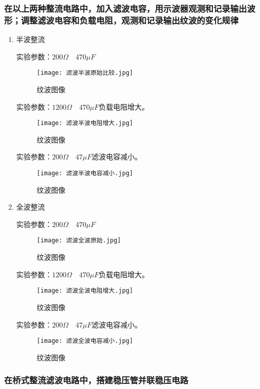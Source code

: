 \documentclass[dvipsnames, svgnames,a4paper,11pt]{article}
\begin{document}
\subsubsection{在以上两种整流电路中，加入滤波电容，用示波器观测和记录输出波形；调整滤波电容和负载电阻，观测和记录输出纹波的变化规律}
\begin{enumerate}
	\item 半波整流 
	
	实验参数：$200\Omega\quad 470\mu F$
	\begin{figure}[{H}]
		\centering
		\texttt{[image: 滤波半波原始比较.jpg]}
		\caption{纹波图像}
		\label{}
	\end{figure}

实验参数：$1200\Omega\quad 470\mu F$负载电阻增大。
\begin{figure}[{H}]
	\centering
	\texttt{[image: 滤波半波电阻增大.jpg]}
	\caption{纹波图像}
	\label{}
\end{figure}
实验参数：$200\Omega\quad 47\mu F$滤波电容减小。
\begin{figure}[{H}]
	\centering
	\texttt{[image: 滤波半波电容减小.jpg]}
	\caption{纹波图像}
	\label{}
\end{figure}
\item 全波整流

	实验参数：$200\Omega\quad 470\mu F$
\begin{figure}[{H}]
	\centering
	\texttt{[image: 滤波全波原始.jpg]}
	\caption{纹波图像}
	\label{}
\end{figure}

实验参数：$1200\Omega\quad 470\mu F$负载电阻增大。
\begin{figure}[{H}]
	\centering
	\texttt{[image: 滤波全波电阻增大.jpg]}
	\caption{纹波图像}
	\label{}
\end{figure}
实验参数：$200\Omega\quad 47\mu F$滤波电容减小。
\begin{figure}[{H}]
	\centering
	\texttt{[image: 滤波全波电容减小.jpg]}
	\caption{纹波图像}
	\label{}
\end{figure}
 

\end{enumerate}

	\subsubsection{在桥式整流滤波电路中，搭建稳压管并联稳压电路}
\end{document}
